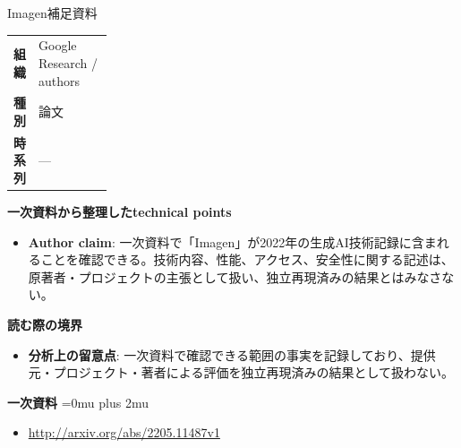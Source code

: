 \begin{technicalnote}{Imagen}{補足資料}
\begingroup
\begin{tabularx}{\linewidth}{@{}>{\bfseries}p{0.22\linewidth}X@{}}
組織 & Google Research / authors \\
種別 & 論文 \\
時系列 & — \\
\end{tabularx}
\smallskip
{\bfseries 一次資料から整理したtechnical points}
\begin{itemize}[leftmargin=1.5em,itemsep=0.35em]
\item \textbf{Author claim}: 一次資料で「Imagen」が2022年の生成AI技術記録に含まれることを確認できる。技術内容、性能、アクセス、安全性に関する記述は、原著者・プロジェクトの主張として扱い、独立再現済みの結果とはみなさない。
\end{itemize}
\begin{minipage}{\linewidth}
{\bfseries 読む際の境界}
\begin{itemize}[leftmargin=1.5em,itemsep=0.35em]
\item \textbf{分析上の留意点}: 一次資料で確認できる範囲の事実を記録しており、提供元・プロジェクト・著者による評価を独立再現済みの結果として扱わない。
\end{itemize}
\begin{samepage}
{\bfseries 一次資料}
\begingroup\sloppy
\Urlmuskip=0mu plus 2mu\relax
\begin{itemize}[leftmargin=1.5em,itemsep=0.25em]
\item {\scriptsize\url{http://arxiv.org/abs/2205.11487v1}}
\end{itemize}
\endgroup
\end{samepage}
\end{minipage}
\endgroup
\end{technicalnote}
\medskip

